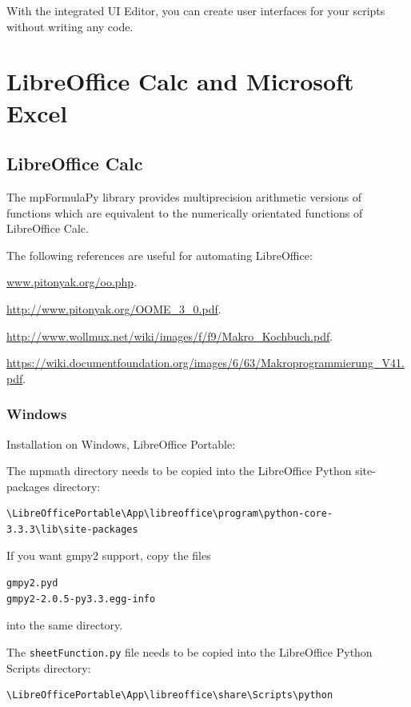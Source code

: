 With the integrated UI Editor, you can create user interfaces for your scripts without writing any code.





\chapter{LibreOffice Calc and Microsoft Excel}
\label{Spreadsheets} 


\section{LibreOffice Calc}
The mpFormulaPy library provides multiprecision arithmetic versions of  functions which are equivalent to the numerically orientated functions of LibreOffice Calc.

The following references are useful for automating LibreOffice:

\vpara
\href{www.pitonyak.org/oo.php}{www.pitonyak.org/oo.php}. 

\vpara
\href{http://www.pitonyak.org/OOME\_3\_0.pdf}{http://www.pitonyak.org/OOME\_3\_0.pdf}. 

\vpara
\href{http://www.wollmux.net/wiki/images/f/f9/Makro\_Kochbuch.pdf}{http://www.wollmux.net/wiki/images/f/f9/Makro\_Kochbuch.pdf}. 

\vpara
\href{https://wiki.documentfoundation.org/images/6/63/Makroprogrammierung\_V41.pdf}{https://wiki.documentfoundation.org/images/6/63/Makroprogrammierung\_V41.pdf}. 







\subsection{Windows}
Installation on Windows, LibreOffice Portable:

The mpmath directory needs to be copied into the LibreOffice Python site-packages directory:
\begin{verbatim}
\LibreOfficePortable\App\libreoffice\program\python-core-3.3.3\lib\site-packages
\end{verbatim}
If you want gmpy2 support, copy the files 
\begin{verbatim}
gmpy2.pyd
gmpy2-2.0.5-py3.3.egg-info
\end{verbatim}
into the same directory.
	
The \verb|sheetFunction.py| file needs to be copied into the  LibreOffice Python Scripts directory:
\begin{verbatim}
\LibreOfficePortable\App\libreoffice\share\Scripts\python
\end{verbatim}


